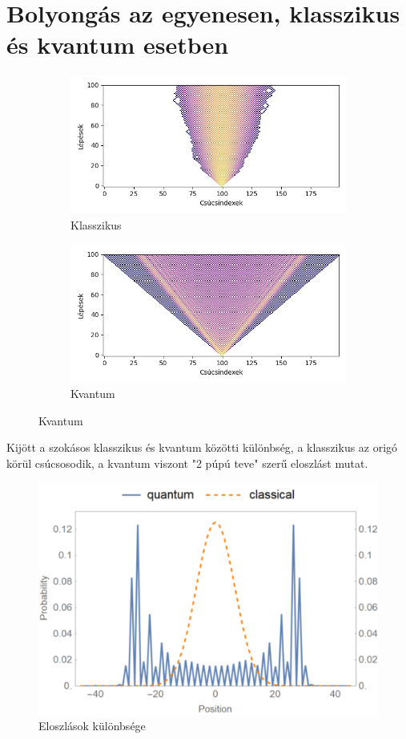 \section{Bolyongás az egyenesen, klasszikus és kvantum esetben}

\begin{figure}[H]
  \centering
  \begin{subfigure}{.45\linewidth}
    \centering
    \includegraphics[width=\linewidth]{./figures/quantum/classical_simulation_short.jpg}
    \caption{Klasszikus}
  \end{subfigure}
  \begin{subfigure}{.45\linewidth}
    \centering
    \includegraphics[width=\linewidth]{./figures/quantum/quantum_simulation_short.jpg}
    \caption{Kvantum}
  \end{subfigure}
\end{figure}

Kijött a szokásos klasszikus és kvantum közötti különbség, a klasszikus az
origó körül csúcsosodik, a kvantum viszont "2 púpú teve" szerű eloszlást mutat.

\begin{figure}[H]
  \centering
  \includegraphics[width=0.5\linewidth]{./figures/quantum/teve.png}
  \caption{Eloszlások különbsége}
\end{figure}

